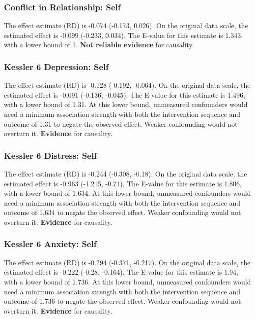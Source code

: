 \documentclass[
  singlecolumn]{article}
\begin{document}
\subsubsection{Conflict in Relationship:
Self}\label{conflict-in-relationship-self-13}

The effect estimate (RD) is -0.074 (-0.173, 0.026). On the original data
scale, the estimated effect is -0.099 (-0.233, 0.034). The E-value for
this estimate is 1.343, with a lower bound of 1. \textbf{Not reliable
evidence} for causality.

\subsubsection{Kessler 6 Depression:
Self}\label{kessler-6-depression-self-13}

The effect estimate (RD) is -0.128 (-0.192, -0.064). On the original
data scale, the estimated effect is -0.091 (-0.136, -0.045). The E-value
for this estimate is 1.496, with a lower bound of 1.31. At this lower
bound, unmeasured confounders would need a minimum association strength
with both the intervention sequence and outcome of 1.31 to negate the
observed effect. Weaker confounding would not overturn it.
\textbf{Evidence} for causality.

\subsubsection{Kessler 6 Distress:
Self}\label{kessler-6-distress-self-13}

The effect estimate (RD) is -0.244 (-0.308, -0.18). On the original data
scale, the estimated effect is -0.963 (-1.215, -0.71). The E-value for
this estimate is 1.806, with a lower bound of 1.634. At this lower
bound, unmeasured confounders would need a minimum association strength
with both the intervention sequence and outcome of 1.634 to negate the
observed effect. Weaker confounding would not overturn it.
\textbf{Evidence} for causality.

\subsubsection{Kessler 6 Anxiety: Self}\label{kessler-6-anxiety-self-13}

The effect estimate (RD) is -0.294 (-0.371, -0.217). On the original
data scale, the estimated effect is -0.222 (-0.28, -0.164). The E-value
for this estimate is 1.94, with a lower bound of 1.736. At this lower
bound, unmeasured confounders would need a minimum association strength
with both the intervention sequence and outcome of 1.736 to negate the
observed effect. Weaker confounding would not overturn it.
\textbf{Evidence} for causality.
\end{document}
